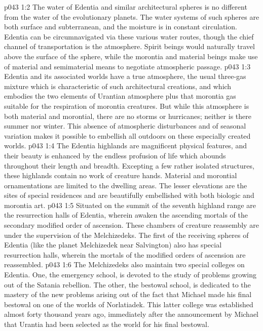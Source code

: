 \vs p043 1:2 The water of Edentia and similar architectural spheres is no different from the water of the evolutionary planets. The water systems of such spheres are both surface and subterranean, and the moisture is in constant circulation. Edentia can be circumnavigated via these various water routes, though the chief channel of transportation is the atmosphere. Spirit beings would naturally travel above the surface of the sphere, while the morontia and material beings make use of material and semimaterial means to negotiate atmospheric passage.\plusone
\vs p043 1:3 Edentia and its associated worlds have a true atmosphere, the usual three\hyp{}gas mixture which is characteristic of such architectural creations, and which embodies the two elements of Urantian atmosphere plus that morontia gas suitable for the respiration of morontia creatures. But while this atmosphere is both material and morontial, there are no storms or hurricanes; neither is there summer nor winter. This absence of atmospheric disturbances and of seasonal variation makes it possible to embellish all outdoors on these especially created worlds.
\vs p043 1:4 The Edentia highlands are magnificent physical features, and their beauty is enhanced by the endless profusion of life which abounds throughout their length and breadth. Excepting a few rather isolated structures, these highlands contain no work of creature hands. Material and morontial ornamentations are limited to the dwelling areas. The lesser elevations are the sites of special residences and are beautifully embellished with both biologic and morontia art.\plusone
\pc \vs p043 1:5 Situated on the summit of the seventh highland range are the resurrection halls of Edentia, wherein awaken the ascending mortals of the secondary modified order of ascension. These chambers of creature reassembly are under the supervision of the Melchizedeks. The first of the receiving spheres of Edentia (like the planet Melchizedek near Salvington) also has special resurrection halls, wherein the mortals of the modified orders of ascension are reassembled.
\vs p043 1:6 The Melchizedeks also maintain two special colleges on Edentia. One, the emergency school, is devoted to the study of problems growing out of the Satania rebellion. The other, the bestowal school, is dedicated to the mastery of the new problems arising out of the fact that Michael made his final bestowal on one of the worlds of Norlatiadek. This latter college was established almost forty thousand years ago, immediately after the announcement by Michael that Urantia had been selected as the world for his final bestowal.
